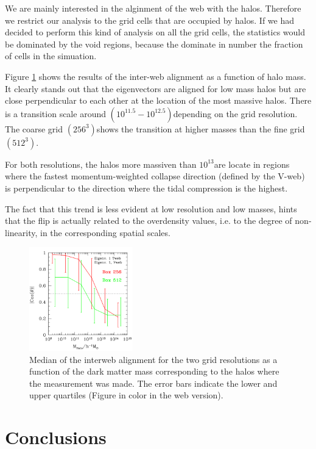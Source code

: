 \documentclass[useAMS,usenatbib]{mn2e}
\newcommand{\hMsun}{{\ifmmode{h^{-1}{\rm
        {M_{\odot}}}}\else{$h^{-1}{\rm{M_{\odot}}}$}\fi}}
\begin{document}
We are mainly interested in the alginment of the web with
the halos. Therefore we restrict our analysis to the grid cells that are
occupied by halos. If we had decided to perform this kind of analysis
on all the grid cells, the statistics would be dominated by the void
regions, because the dominate in number the fraction of cells in the
simuation.

Figure \ref{fig:interweb} shows the results of the inter-web alignment
as a function of halo mass. It clearly stands out that the
eigenvectors are aligned for low mass halos but are close perpendicular to
each other at the location of the most massive halos. There is a
transition scale around $(10^{11.5}-10^{12.5})$\hMsun depending on the
grid resolution. The coarse grid $(256^3)$shows the transition at higher masses
than the fine grid $(512^3)$.  


For both resolutions, the halos more massiven than $10^{13}$\hMsun are
locate in regions where the fastest momentum-weighted collapse
direction (defined by the V-web) is perpendicular to the direction
where the tidal compression is the highest. 

The fact that this trend is less evident at low resolution and low
masses, hints that the flip is actually related to the overdensity
values, i.e. to the degree of non-linearity, in the corresponding
spatial scales.





\begin{figure}
\includegraphics[width=0.40\textwidth]{web.pdf}
\caption{Median of the interweb alignment for the two grid
  resolutions as a function of the dark matter mass corresponding to
  the halos where the measurement was made. The error bars indicate
  the lower and upper quartiles (Figure in color in the web version).
\label{fig:interweb}} 
\end{figure}


\section{Conclusions}
\label{sec:conclusions}
\end{document}

